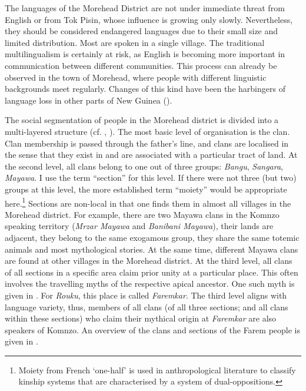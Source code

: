 The languages of the Morehead District are not under immediate threat from English or from Tok Pisin, whose influence is growing only slowly. Nevertheless, they should be considered endangered languages due to their small size and limited distribution. Most are spoken in a single village. The traditional multilingualism is certainly at risk, as English is becoming more important in communication between different communities. This process can already be observed in the town of Morehead, where people with different linguistic backgrounds meet regularly. Changes of this kind have been the harbingers of language loss in other parts of New Guinea (\cite{Aikhenvald:2002ul}).

The social segmentation of people in the Morehead district is divided into a multi-layered structure (cf. \cite{Williams:1936hb}, \cite{Ayres:1983dw}). The most basic level of organisation is the clan. Clan membership is passed through the father's line, and clans are localised in the sense that they exist in and are associated with a particular tract of land. At the second level, all clans belong to one out of three groups: \textit{Bangu}, \textit{Sangara}, \textit{Mayawa}. I use the term ``section'' for this level. If there were not three (but two) groups at this level, the more established term ``moiety'' would be appropriate here.\footnote{Moiety from French `one-half' is used in anthropological literature to classify kinship systems that are characterised by a system of dual-oppositions.} Sections are non-local in that one finds them in almost all villages in the Morehead district. For example, there are two Mayawa clans in the Komnzo speaking territory (\textit{Mrzar Mayawa} and \textit{Banibani Mayawa}), their lands are adjacent, they belong to the same exogamous group, they share the same totemic animals and most mythological stories. At the same time, different Mayawa clans are found at other villages in the Morehead district. At the third level, all clans of all sections in a specific area claim prior unity at a particular place. This often involves the travelling myths of the respective apical ancestor. One such myth is given in . For \textit{Rouku}, this place is called \textit{Faremkar}. The third level aligns with language variety, thus, members of all clans (of all three sections; and all clans within these sections) who claim their mythical origin at \textit{Faremkar} are also speakers of Komnzo. An overview of the clans and sections of the Farem people is given in .

